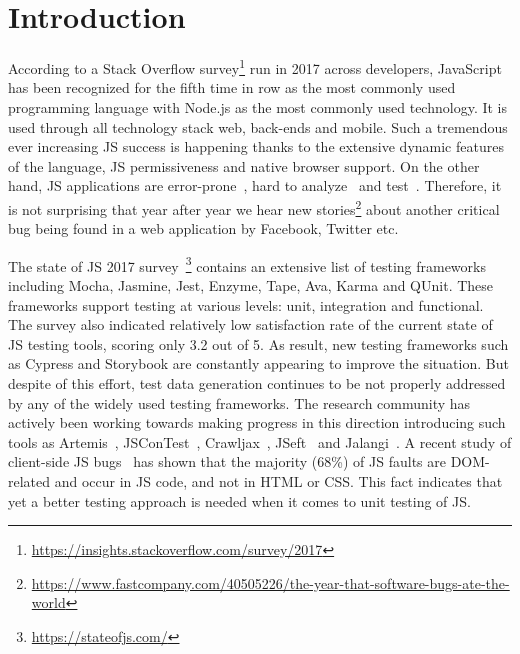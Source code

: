 \documentclass[sigconf,review,anonymous]{acmart}
\begin{document}


\maketitle


\section{Introduction}
\label{sec.intro}

According to a Stack Overflow survey\footnote{\url{https://insights.stackoverflow.com/survey/2017}} run in 2017 across developers, JavaScript has been recognized for the fifth time in row as the most commonly used programming language with Node.js as the most commonly used technology. It is used through all technology stack web, back-ends and mobile. Such a tremendous ever increasing JS success is happening thanks to the extensive dynamic features of the language, JS permissiveness and native browser support. On the other hand, JS applications are error-prone~\cite{why}, hard to analyze~\cite{why} and test~\cite{why}. Therefore, it is not surprising that year after year we hear new stories\footnote{\url{https://www.fastcompany.com/40505226/the-year-that-software-bugs-ate-the-world}} about another critical bug being found in a web application by Facebook, Twitter etc. 



The state of JS 2017 survey~\footnote{\url{https://stateofjs.com/}} contains an extensive list of testing frameworks including Mocha, Jasmine, Jest, Enzyme, Tape, Ava, Karma and QUnit. These frameworks support testing at various levels: unit, integration and functional. The survey also indicated relatively low satisfaction rate of the current state of JS testing tools, scoring only 3.2 out of 5. As result, new testing frameworks such as Cypress and Storybook are constantly appearing to improve the situation. But despite of this effort, test data generation continues to be not properly addressed by any of the widely used testing frameworks. The research community has actively been working towards making progress in this direction introducing such tools as Artemis~\cite{artemis2011}, JSConTest~\cite{heidegger2010contract}, Crawljax~\cite{mesbah2012crawling}, JSeft~\cite{mirshokraie2015jseft} and Jalangi~\cite{sen2013jalangi}. A recent study of client-side JS bugs~\cite{ocariza2017study} has shown that the majority (68\%) of JS faults are DOM-related and occur in JS code, and not in HTML or CSS. This fact indicates that yet a better testing approach is needed when it comes to unit testing of JS.
\end{document}
